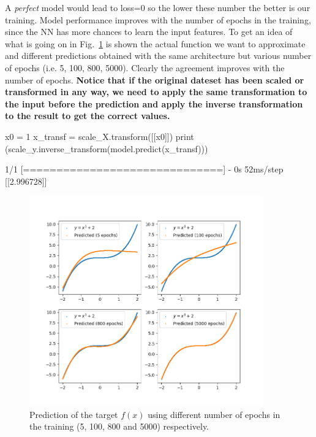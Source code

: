 A \emph{perfect} model would lead to loss=0 so the lower these number the better is our training. 
Model performance improves with the number of epochs in the training, since the NN has more chances to learn the input features. To get an idea of what is going on in Fig.~\ref{fig:training_vs_epochs} is shown the actual function we want to approximate and different predictions obtained with the same architecture but various number of epochs (i.e. 5, 100, 800, 5000). Clearly the agreement improves with the number of epochs.
\textbf{Notice that if the original dateset has been scaled or transformed in any way, we need to apply the same transformation to the input before the prediction and apply the inverse transformation to the result to get the correct values.}

\begin{ipythonnon}
x0 = 1
x_transf = scale_X.transform([[x0]])
print (scale_y.inverse_transform(model.predict(x_transf)))
\end{ipythonnon}
\begin{ioutput}
1/1 [==============================] - 0s 52ms/step
[[2.996728]]
\end{ioutput}

\begin{figure}[htb]
\centering
\includegraphics[width=0.9\textwidth]{figures/training_vs_epoch}
\caption{Prediction of the target $f(x)$ using different number of epochs in the training (5, 100, 800 and 5000) respectively.}
\label{fig:training_vs_epochs}
\end{figure}


